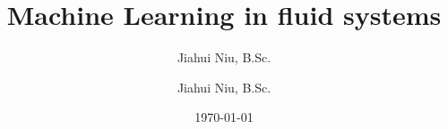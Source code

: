 \title{Machine Learning in fluid systems}

\author{Jiahui Niu, B.Sc.}
\signature{Jiahui Niu, B.Sc.}
\date{\today}
\monat{\today}

